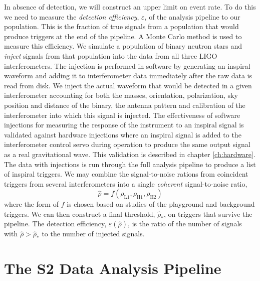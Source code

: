 In absence of detection, we will construct an upper limit on event rate.  To
do this we need to measure the \emph{detection efficiency}, $\varepsilon$, of
the analysis pipeline to our population. This is the fraction of true signals
from a population that would produce triggers at the end of the pipeline. A
Monte Carlo method is used to measure this efficiency. We simulate a
population of binary neutron stars and \emph{inject} signals from that
population into the data from all three LIGO interferometers. The injection is
performed in software by generating an inspiral waveform and adding it to
interferometer data immediately after the raw data is read from disk. We
inject the actual waveform that would be detected in a given interferometer
accounting for both the masses, orientation, polarization, sky position and
distance of the binary, the antenna pattern and calibration of the
interferometer into which this signal is injected.  The effectiveness of
software injections for measuring the response of the instrument to an
inspiral signal is validated against hardware injections where an inspiral
signal is added to the interferometer control servo during operation to
produce the same output signal as a real gravitational wave. This validation
is described in chapter \ref{ch:hardware}. The data with injections is run
through the full analysis pipeline to produce a list of inspiral triggers.
We may combine the signal-to-noise rations from coincident triggers from
several interferometers into a single \emph{coherent} signal-to-noise ratio,
\begin{equation}
\hat{\rho} = f(\rho_\mathrm{L1},\rho_\mathrm{H1},\rho_\mathrm{H2})
\end{equation}
where the form of $f$ is chosen based on studies of the playground and
background triggers. We can then construct a final threshold,
$\hat{\rho}_\ast$, on triggers that survive the pipeline. The detection
efficiency, $\varepsilon(\hat{\rho})$, is the ratio of the number of signals
with $\hat{\rho} > \hat{\rho}_\ast$  to the number of injected signals.

\section{The S2 Data Analysis Pipeline}
\label{s:s2pipeline}

